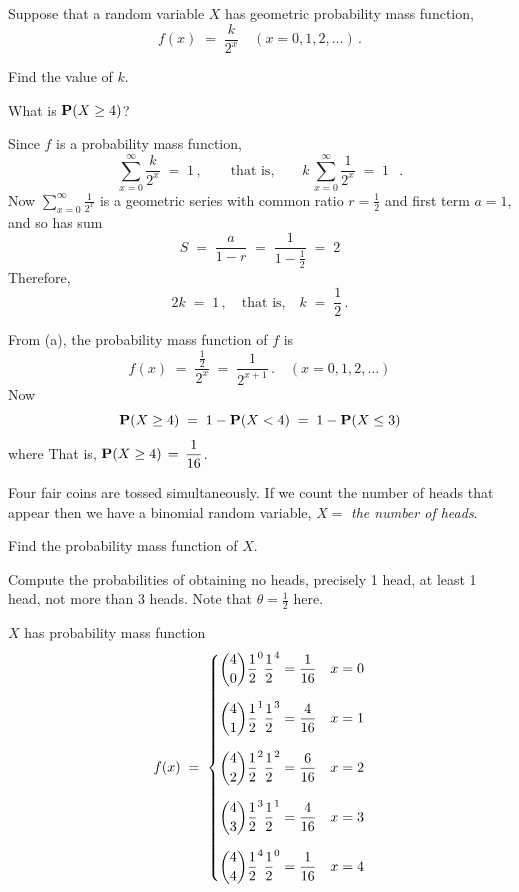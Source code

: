 \begin{ExerciseList}
\Exercise
Suppose that  a random variable $X$ has geometric  probability mass function,
  \[f(x)\;=\;\frac{k}{2^x}\quad (x=0,1,2,\dots)\,.\]
\be
\item Find the value of  $k$.
\item  What is  $\mathbf{P}(X\geq 4)$?
\ee
\Answer
\be
\item
Since $f$ is a probability mass function,  $$\sum_{x=0}^\infty\frac{k}{2^x}\;=\;1\,, 
\qquad \text{that is,}\qquad k\,\sum_{x=0}^\infty\frac{1}{2^x}\;=\;1\ \enspace.$$
Now $\displaystyle \sum_{x=0}^\infty\frac{1}{2^x}$ is a geometric series with common ratio $r= \frac{1}{2}$ and first term $a=1$,
and so has  sum
\[ S\;=\; \frac{a}{1-r} \;=\;\frac{1}{1-\frac{1}{2} } \;=\; 2\]
Therefore, \[  2 k\;=\; 1 \,, \quad \text{that
  is,}\quad k\;=\; \frac{1}{2}\,.\]

\item From (a), the probability mass function of $f$ is
  $$f(x)\;=\;\frac{\frac{1}{2}}{2^{x}}\;=\;\frac{1}{2^{x+1}}\,.\quad
  (x=0,1,2,\dots)$$ Now
\[\mathbf{P}(X\geq 4)\;=\;1-\mathbf{P}(X<4)\;=\;1-\mathbf{P}(X\leq3)\] where
That is,  $\mathbf{P}(X\geq4)\,=\,\displaystyle \frac{1}{16}$.
\ee

\Exercise
Four fair coins are tossed simultaneously.  
If we count the number of heads that appear then we have a  binomial random variable,  $X=$ {\it the number of heads}.
\be
\item Find the probability mass
  function of  $X$.
\item  Compute the probabilities of obtaining no heads, precisely 1
  head, at least 1 head, not more than 3 heads.
\ee
\Answer
Note that  $\theta=\frac{1}{2}$ here.
\be
\item $X$ has probability mass function
\[f(x)\;=\;\begin{cases}
\displaystyle\displaystyle \binom{4}{0}\frac{1}{2}^0\frac{1}{2}^4=\frac{1}{16}&x=0\\[16pt]
\displaystyle\displaystyle\binom{4}{1}\frac{1}{2}^1\frac{1}{2}^3=\frac{4}{16}&x=1\\[16pt]
\displaystyle\displaystyle\binom{4}{2}\frac{1}{2}^2\frac{1}{2}^2=\frac{6}{16}&x=2\\[16pt]
\displaystyle\binom{4}{3}\frac{1}{2}^3\frac{1}{2}^1=\frac{4}{16}&x=3\\[16pt]
\displaystyle\binom{4}{4}\frac{1}{2}^4\frac{1}{2}^0=\frac{1}{16}&x=4
\displaystyle\end{cases}
\]


\end{ExerciseList}
